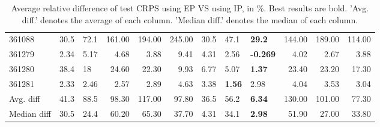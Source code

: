 \begin{table}[ht!]
\begin{tabular}{lllrrrlllrrr}
  361088 & 30.5 & 72.1 & 161.00 & 194.00 & 245.00 & 30.5 & 47.1 & \textbf{29.2} & 144.00 & 189.00 & 114.00 \\ 
  361279 & 2.34 & 5.17 & 4.68 & 3.88 & 9.41 & 4.31 & 2.56 & \textbf{-0.269} & 4.02 & 2.67 & 3.88 \\ 
  361280 & 38.4 & 18 & 24.60 & 22.30 & 9.93 & 6.77 & 5.07 & \textbf{1.37} & 23.40 & 23.20 & 17.30 \\ 
  361281 & 2.33 & 2.46 & 2.57 & 2.89 & 4.63 & 3.38 & \textbf{1.56} & 2.98 & 4.04 & 3.53 & 3.04 \\ 
   \hline
Avg. diff & 41.3 & 88.5 & 98.30 & 117.00 & 97.80 & 36.5 & 56.2 & \textbf{6.34} & 130.00 & 101.00 & 77.30 \\ 
  Median diff & 30.5 & 24.4 & 60.20 & 65.30 & 37.70 & 4.31 & 34.1 & \textbf{2.98} & 51.90 & 27.00 & 33.80 \\ 
   \hline
\hline
\end{tabular}
\endgroup
\caption{Average relative difference of test CRPS using EP VS using IP, in \%. 
                  Best results are bold. 
                  'Avg. diff.' denotes the average of each column.
                  'Median diff.' denotes the median of each column.} 
\label{TABLES/table_results_CRPS_clustering_only_num_EP_VS_IP}
\end{table}
